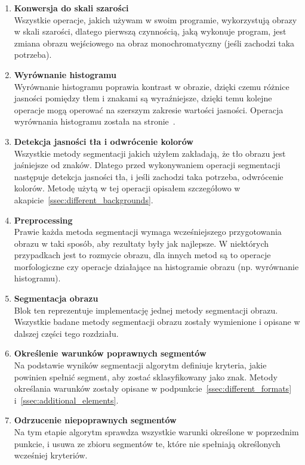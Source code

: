 \begin{enumerate}
  \item \textbf{Konwersja do skali szarości}\\
    Wszystkie operacje, jakich używam w swoim programie, wykorzystują obrazy w skali szarości, dlatego pierwszą czynnością, jaką wykonuje program, jest zmiana obrazu wejściowego na obraz monochromatyczny (jeśli zachodzi taka potrzeba).
  \item \textbf{Wyrównanie histogramu}\\
    Wyrównanie histogramu poprawia kontrast w obrazie, dzięki czemu różnice jasności pomiędzy tłem i znakami są wyraźniejsze, dzięki temu kolejne operacje mogą operować na szerszym zakresie wartości jasności. Operacja wyrównania histogramu została na stronie~\pageref{sssec:histogram_eq}.
  \item \textbf{Detekcja jasności tła i odwrócenie kolorów} \\
    Wszystkie metody segmentacji jakich użyłem zakładają, że tło obrazu jest jaśniejsze od znaków. Dlatego przed wykonywaniem operacji segmentacji następuje detekcja jasności tła, i jeśli zachodzi taka potrzeba, odwrócenie kolorów. Metodę użytą w tej operacji opisałem szczegółowo w akapicie~\ref{ssec:different_backgrounds}.
  \item \textbf{Preprocessing}\\
    Prawie każda metoda segmentacji wymaga wcześniejszego przygotowania obrazu w taki sposób, aby rezultaty były jak najlepsze. W niektórych przypadkach jest to rozmycie obrazu, dla innych metod są to operacje morfologiczne czy operacje działające na histogramie obrazu (np. wyrównanie histogramu).
  \item \textbf{Segmentacja obrazu}\\
    Blok ten reprezentuje implementację jednej metody segmentacji obrazu. Wszystkie badane metody segmentacji obrazu zostały wymienione i opisane w dalszej części tego rozdziału.
    \item \textbf{Określenie warunków poprawnych segmentów}\\
      Na podstawie wyników segmentacji algorytm definiuje kryteria, jakie powinien spełnić segment, aby zostać sklasyfikowany jako znak. Metody określania warunków zostały opisane w podpunkcie~\ref{ssec:different_formats} i~\ref{ssec:additional_elements}.
    \item \textbf{Odrzucenie niepoprawnych segmentów}\\
      Na tym etapie algorytm sprawdza wszystkie warunki określone w poprzednim punkcie, i usuwa ze zbioru segmentów te, które nie spełniają określonych wcześniej kryteriów.

\end{enumerate}
